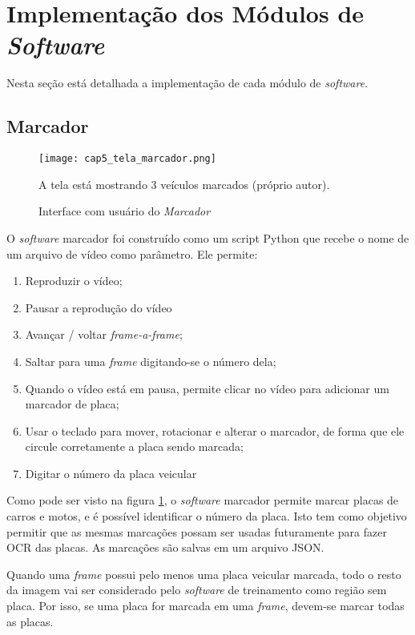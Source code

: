 \section{Implementação dos Módulos de \emph{Software}} \label{sec:cap5_impl}

Nesta seção está detalhada a implementação de cada módulo de \emph{software}.

\subsection{Marcador}

\begin{figure}[!htb]
	\centering
	\texttt{[image: cap5\_tela\_marcador.png]}
	\caption{Interface com usuário do \emph{Marcador}}
	\label{fig:cap5_tela_marcador}
	A tela está mostrando 3 veículos marcados (próprio autor).
\end{figure}

O \emph{software} marcador foi construído como um script Python que recebe o
nome de um arquivo de vídeo como parâmetro. Ele permite:

\begin{enumerate}
\item Reproduzir o vídeo;
\item Pausar a reprodução do vídeo
\item Avançar / voltar \emph{frame-a-frame};
\item Saltar para uma \emph{frame} digitando-se o número dela;
\item Quando o vídeo está em pausa, permite clicar no vídeo para adicionar um
	marcador de placa;
\item Usar o teclado para mover, rotacionar e alterar o marcador, de forma que ele
	circule corretamente a placa sendo marcada;
\item Digitar o número da placa veicular
\end{enumerate}

Como pode ser visto na figura \ref{fig:cap5_tela_marcador}, o \emph{software}
marcador permite marcar placas de
carros e motos, e é possível identificar o número da placa. Isto tem como
objetivo permitir que as mesmas marcações possam ser usadas futuramente para
fazer OCR das placas. As marcações são salvas em um arquivo JSON.

Quando uma \emph{frame} possui pelo menos uma placa veicular marcada, todo
o resto da
imagem vai ser considerado pelo \emph{software} de treinamento como região
sem placa.  Por isso, se uma placa for marcada em uma \emph{frame}, devem-se
marcar todas as placas.

